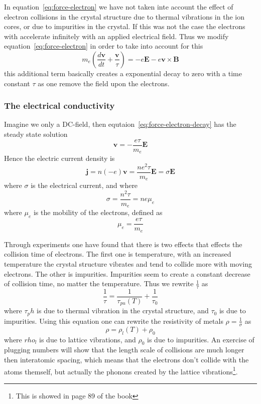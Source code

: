 \documentclass[11pt]{article}
\begin{document}
In equation~\ref{eq:force-electron} we have not taken inte account the effect of electron collisions in the crystal structure due to thermal vibrations in the ion cores, or due to impurities in the crystal. If this was not the case the electrons with accelerate infinitely with an applied electrical field. Thus we modify equation~\ref{eq:force-electron} in order to take into account for this
\begin{equation}
	m_e (\frac{d\pmb{v}}{dt} + \frac{\pmb{v}}{\tau} )= - e\pmb{E} - e\pmb{v} \times \pmb{B}
	\label{eq:force-electron-decay}
\end{equation}
this additional term basically creates a exponential decay to zero with a time constant $\tau$ as one remove the field upon the electrons.

\subsubsection{The electrical conductivity}
Imagine we only a DC-field, then equtaion~\ref{eq:force-electron-decay} has the steady state solution
\begin{equation}
	\pmb{v} = -\frac{e\tau}{m_e}\pmb{E}
\end{equation}
Hence the electric current density is 
\begin{equation}
	\pmb{j} = n(-e)\pmb{v} = \frac{ne^2\tau}{m_e} \pmb{E} = \sigma \pmb{E}
\end{equation}
where $\sigma$ is the electrical current, and where
\begin{equation}
	\sigma = \frac{n^2\tau}{m_e} = ne\mu_e
\end{equation}
where $\mu_e$ is the mobility of the electrons, defined as
\begin{equation}
	\mu_e = \frac{e\tau}{m_e}
\end{equation}

Through experiments one have found that there is two effects that effects the collision time of electrons. The first one is temperature, with an increased temperature the crystal structure vibrates and tend to collide more with moving electrons. The other is impurities. Impurities seem to create a constant decrease of collision time, no matter the temperature. Thus we rewrite $\frac{1}{\tau}$ as
\begin{equation}
	\frac{1}{\tau} = \frac{1}{\tau_{pu}(T)} + \frac{1}{\tau_0}
\end{equation}
where $\tau_ph$ is due to thermal vibration in the crystal structure, and $\tau_0$ is due to impurities. Using this equation one can rewrite the resistivity of metals $\rho = \frac{1}{\sigma}$ as
\begin{equation}
	\rho = \rho_l(T) + \rho_0
\end{equation}
where $rho_l$ is due to lattice vibrations, and $\rho_0$ is due to impurities. An exercise of plugging numbers will show that the length scale of collisions are much longer then interatomic spacing, which means that the electrons don't collide with the atoms themself, but actually the phonons created by the lattice vibrations\footnote{This is showed in page 89 of the book}.
\end{document}
